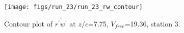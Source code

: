 \begin{figure}[H]
\centering
\texttt{[image: figs/run\_23/run\_23\_rw\_contour]}
\caption{Contour plot of $\overline{r^\prime w^\prime}$ at $z/c$=7.75, $V_{free}$=19.36, station 3.}
\label{fig:run_23_rw_contour}
\end{figure}



